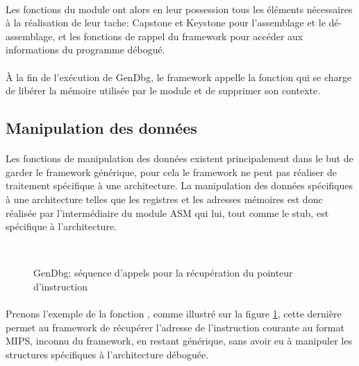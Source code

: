 \documentclass[11pt, book, english, french, standardlists]{upmethodology-document}
\begin{document}
				\paragraph*{}
					Les fonctions du module ont alors en leur possession tous les éléments nécessaires à la réalisation de leur tache: Capstone et Keystone pour l'assemblage et le dé-assemblage, et les fonctions de rappel du framework pour accéder aux informations du programme débogué.
				\paragraph*{}
					À la fin de l’exécution de GenDbg, le framework appelle la fonction  qui se charge de libérer la mémoire utilisée par le module et de supprimer son contexte.
			\subsection{Manipulation des données}
				\paragraph*{}
					Les fonctions de manipulation des données existent principalement dans le but de garder le framework générique, pour cela le framework ne peut pas réaliser de traitement spécifique à une architecture. La manipulation des données spécifiques à une architecture telles que les registres et les adresses mémoires est donc réalisée par l'intermédiaire du module ASM qui lui, tout comme le stub, est spécifique à l'architecture.
				\begin{figure}[H]
					\centering
					\\
					\vspace{5pt}
					\caption{GenDbg: séquence d'appels pour la récupération du pointeur d'instruction}
					\label{fig:GenDbg_sequence_GetInstructionPointer}
				\end{figure}
				\paragraph*{}
					Prenons l'exemple de la fonction , comme illustré sur la figure \ref{fig:GenDbg_sequence_GetInstructionPointer}, cette dernière permet au framework de récupérer l'adresse de l'instruction courante au format MIPS, inconnu du framework, en restant générique, sans avoir eu à manipuler les structures spécifiques à l'architecture déboguée.
\end{document}
